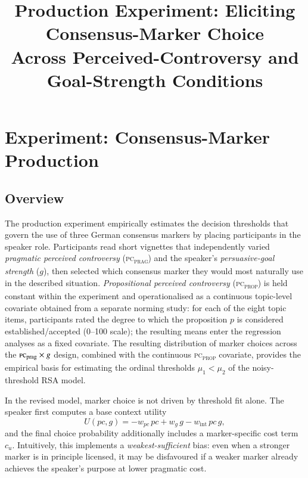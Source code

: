 \documentclass[12pt]{article}
\title{Production Experiment: Eliciting Consensus-Marker Choice\\
       Across Perceived-Controversy and Goal-Strength Conditions}
\author{}
\date{}
\begin{document}

\section{Experiment: Consensus-Marker Production}

\subsection{Overview}

The production experiment empirically estimates the decision thresholds
that govern the use of three German consensus markers by placing
participants in the speaker role.
Participants read short vignettes that independently varied
\emph{pragmatic perceived controversy} (\textsc{pc\textsubscript{prag}})
and the speaker's \emph{persuasive-goal strength} ($g$), then selected
which consensus marker they would most naturally use in the described
situation.
\emph{Propositional perceived controversy} (\textsc{pc\textsubscript{prop}})
is held constant within the experiment and operationalised as a continuous
topic-level covariate obtained from a separate norming study: for each
of the eight topic items, participants rated the degree to which the
proposition $p$ is considered established/accepted (0--100 scale);
the resulting means enter the regression analyses as a fixed covariate.
The resulting distribution of marker choices across the
$\textsc{pc}_\text{prag} \times g$ design, combined with the
continuous \textsc{pc\textsubscript{prop}} covariate, provides the
empirical basis for estimating the ordinal thresholds
$\mu_1 < \mu_2$ of the noisy-threshold RSA model.

In the revised model, marker choice is not driven by threshold fit alone.
The speaker first computes a base context utility
\[
U(pc,g) = -w_{pc}\,pc + w_g\,g - w_{\mathrm{int}}\,pc\,g,
\]
and the final choice probability additionally includes a marker-specific
cost term $c_u$.
Intuitively, this implements a \emph{weakest-sufficient} bias: even when
a stronger marker is in principle licensed, it may be disfavoured if a
weaker marker already achieves the speaker's purpose at lower pragmatic cost.
\end{document}
